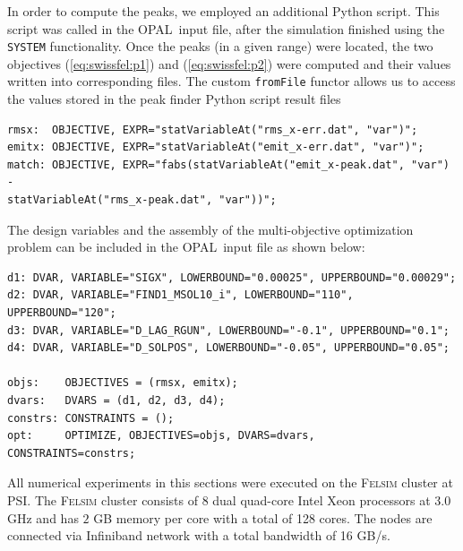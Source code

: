 In order to compute the peaks, we employed an additional Python script.
This script was called in the \textsc{OPAL}~input file, after the simulation
  finished using the \texttt{SYSTEM} functionality.
Once the peaks (in a given range) were located, the two objectives
  (\ref{eq:swissfel:p1}) and (\ref{eq:swissfel:p2}) were computed and their
  values written into corresponding files.
The custom \texttt{fromFile} functor allows us to access the values stored in
  the peak finder Python script result files
%

\begin{flushleft}
\begin{Verbatim}[fontsize=\scriptsize]
rmsx:  OBJECTIVE, EXPR="statVariableAt("rms_x-err.dat", "var")";
emitx: OBJECTIVE, EXPR="statVariableAt("emit_x-err.dat", "var")";
match: OBJECTIVE, EXPR="fabs(statVariableAt("emit_x-peak.dat", "var") -
statVariableAt("rms_x-peak.dat", "var"))";
\end{Verbatim}
\end{flushleft}
\vspace{0.2cm}

\noindent
The design variables and the assembly of the multi-objective optimization problem
  can be included in the \textsc{OPAL}~input file as shown below:

\begin{flushleft}
\begin{Verbatim}[fontsize=\scriptsize]
d1: DVAR, VARIABLE="SIGX", LOWERBOUND="0.00025", UPPERBOUND="0.00029";
d2: DVAR, VARIABLE="FIND1_MSOL10_i", LOWERBOUND="110", UPPERBOUND="120";
d3: DVAR, VARIABLE="D_LAG_RGUN", LOWERBOUND="-0.1", UPPERBOUND="0.1";
d4: DVAR, VARIABLE="D_SOLPOS", LOWERBOUND="-0.05", UPPERBOUND="0.05";

objs:    OBJECTIVES = (rmsx, emitx);
dvars:   DVARS = (d1, d2, d3, d4);
constrs: CONSTRAINTS = ();
opt:     OPTIMIZE, OBJECTIVES=objs, DVARS=dvars,
CONSTRAINTS=constrs;
\end{Verbatim}
\end{flushleft}
\vspace{0.2cm}

All numerical experiments in this sections were executed on the
  \textsc{Felsim} cluster at PSI\@.
The \textsc{Felsim} cluster consists of 8 dual quad-core Intel Xeon
  processors at 3.0 GHz and has $2$ GB memory per core with a total of 128
  cores.
The nodes are connected via Infiniband network with a total bandwidth of 16
  GB/s.

